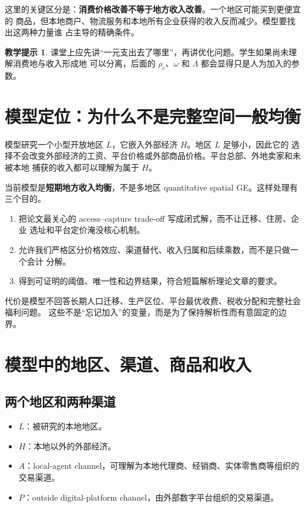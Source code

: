 \documentclass[UTF8,11pt,scheme=chinese,fontset=fandol]{ctexart}
\theoremstyle{definition}
\newtheorem{teachingpoint}{教学提示}[section]
\begin{document}
这里的关键区分是：\textbf{消费价格改善不等于地方收入改善}。一个地区可能买到更便宜的
商品，但本地商户、物流服务和本地所有企业获得的收入反而减少。模型要找出这两种力量谁
占主导的精确条件。

\begin{teachingpoint}
课堂上应先讲“一元支出去了哪里”，再讲优化问题。学生如果尚未理解消费地与收入形成地
可以分离，后面的 \(\rho_c\)、\(\omega\) 和 \(\Lambda\) 都会显得只是人为加入的参数。
\end{teachingpoint}

\section{模型定位：为什么不是完整空间一般均衡}

模型研究一个小型开放地区 \(L\)，它嵌入外部经济 \(H\)。地区 \(L\) 足够小，因此它的
选择不会改变外部经济的工资、平台价格或外部商品价格。平台总部、外地卖家和未被本地
捕获的收入都可以理解为属于 \(H\)。

当前模型是\textbf{短期地方收入均衡}，不是多地区 quantitative spatial GE。这样处理有
三个目的。

\begin{enumerate}
  \item 把论文最关心的 access--capture trade-off 写成闭式解，而不让迁移、住房、企业
  选址和平台定价淹没核心机制。
  \item 允许我们严格区分价格效应、渠道替代、收入归属和后续乘数，而不是只做一个会计
  分解。
  \item 得到可证明的阈值、唯一性和边界结果，符合短篇解析理论文章的要求。
\end{enumerate}

代价是模型不回答长期人口迁移、生产区位、平台最优收费、税收分配和完整社会福利问题。
这些不是“忘记加入”的变量，而是为了保持解析性而有意固定的边界。

\section{模型中的地区、渠道、商品和收入}

\subsection{两个地区和两种渠道}

\begin{itemize}
  \item \(L\)：被研究的本地地区。
  \item \(H\)：本地以外的外部经济。
  \item \(A\)：local-agent channel，可理解为本地代理商、经销商、实体零售商等组织的
  交易渠道。
  \item \(P\)：outside digital-platform channel，由外部数字平台组织的交易渠道。
\end{itemize}
\end{document}
